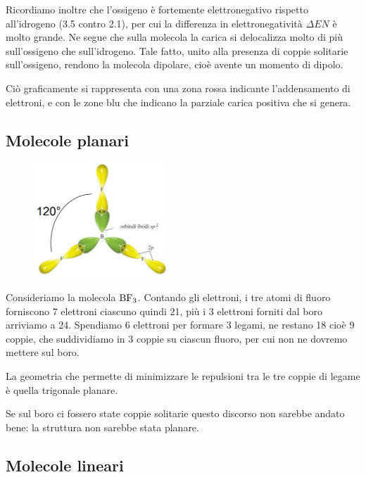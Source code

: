 Ricordiamo inoltre che l'ossigeno è fortemente elettronegativo rispetto all'idrogeno (3.5 contro 2.1), per cui la differenza in elettronegatività $\Delta EN$ è molto grande. Ne segue che sulla molecola la carica si delocalizza molto di più sull'ossigeno che sull'idrogeno. Tale fatto, unito alla presenza di coppie solitarie sull'ossigeno, rendono la molecola dipolare, cioè avente un momento di dipolo.

Ciò graficamente si rappresenta con una zona rossa indicante l'addensamento di elettroni, e con le zone blu che indicano la parziale carica positiva che si genera.

\subsection{Molecole planari}
\vspace{-0.4cm}
\begin{minipage}{0.4\textwidth}
    \begin{figure}[H]
        \includegraphics[width=5cm]{immagini/BF_3.png} 
    \end{figure}
\end{minipage}
\hfill
\begin{minipage}{0.6\textwidth}
\vspace{0.6cm}Consideriamo la molecola $\rm BF_3$. Contando gli elettroni, i tre atomi di fluoro forniscono 7 elettroni ciascuno quindi 21, più i 3 elettroni forniti dal boro arriviamo a 24. Spendiamo 6 elettroni  per formare 3 legami, ne restano 18 cioè 9 coppie, che suddividiamo in 3 coppie su ciascun fluoro, per cui non ne dovremo mettere sul boro.

La geometria che permette di minimizzare le repulsioni tra le tre coppie di legame è quella trigonale planare.

Se sul boro ci fossero state coppie solitarie questo discorso non sarebbe andato bene: la struttura non sarebbe stata planare.
\end{minipage}

\subsection{Molecole lineari}

